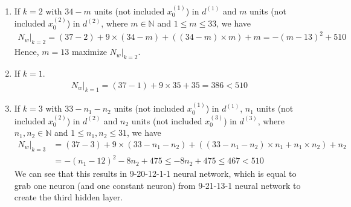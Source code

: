 \documentclass[12pt]{article}
\newcommand{\ParTh}[1]{\left(#1\right)}
\begin{document}
\begin{enumerate}
	\item If $k=2$ with $34-m$ units (not included $x^{\ParTh{1}}_0$) in $d^{\ParTh{1}}$ and $m$ units (not included $x^{\ParTh{2}}_0$) in $d^{\ParTh{2}}$, where $m\in\mathbb{N}$ and $1\leq m\leq33$, we have
	\begin{align}
	\left.N_w\right|_{k=2}=\ParTh{37-2}+9\times\ParTh{34-m}+\ParTh{\ParTh{34-m}\times m}+m=-\ParTh{m-13}^2+510
	\end{align}
	Hence, $m=13$ maximize $\left.N_w\right|_{k=2}$.
	\item If $k=1$.
	\begin{align}
	\left.N_w\right|_{k=1}=\ParTh{37-1}+9\times35+35=386<510
	\end{align}
	\item If $k=3$ with $33-n_1-n_2$ units (not included $x^{\ParTh{1}}_0$) in $d^{\ParTh{1}}$, $n_1$ units (not included $x^{\ParTh{2}}_0$) in $d^{\ParTh{2}}$ and $n_2$ units (not included $x^{\ParTh{3}}_0$) in $d^{\ParTh{3}}$, where $n_1,n_2\in\mathbb{N}$ and $1\leq n_1,n_2\leq31$, we have
	\begin{align}
	\left.N_w\right|_{k=3}&=\ParTh{37-3}+9\times\ParTh{33-n_1-n_2}+\ParTh{\ParTh{33-n_1-n_2}\times n_1+n_1\times n_2}+n_2\\
	&=-\ParTh{n_1-12}^2-8n_2+475\leq-8n_2+475\leq467<510
	\end{align}
	We can see that this results in 9-20-12-1-1 neural network, which is equal to grab one neuron (and one constant neuron) from 9-21-13-1 neural network to create the third hidden layer.

\end{enumerate}
\end{document}
